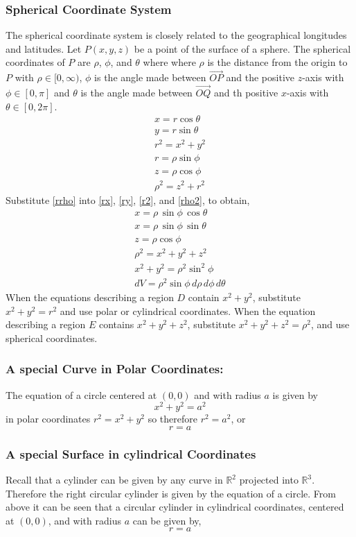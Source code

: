 \documentclass[14pt]{article}
\begin{document}
    \subsubsection{Spherical Coordinate System} 
    The spherical coordinate system is closely related to the geographical longitudes and latitudes. Let $P(x,y,z)$ be a point of the surface of a sphere. The spherical coordinates of $P$ are $\rho$, $\phi$, and $\theta$ where where $\rho$ is the distance from the origin to $P$ with $\rho\in[0,\infty)$, $\phi$ is the angle made between $\vec {OP}$ and the positive $z$-axis with $\phi\in[0, \pi]$ and $\theta$ is the angle made between $\vec{OQ}$ and th positive $x$-axis with $\theta\in[0,2\pi]$.
    \begin{align}
        x=r\cos\theta\label{rx}\\
        y=r\sin\theta\label{ry}\\
        r^2=x^2+y^2\label{r2}\\
        r=\rho\sin\phi\label{rrho}\\
        z=\rho\cos\phi\label{zrho}\\
        \rho^2=z^2+r^2\label{rho2}
    \end{align}
    Substitute \eqref{rrho} into \eqref{rx}, \eqref{ry}, \eqref{r2}, and \eqref{rho2}, to obtain,
    \begin{align*}
        x=\rho\,\sin\phi\,\cos\theta\\
        x=\rho\,\sin\phi\,\sin\theta\\
        z=\rho\cos\phi\\
        \rho^2=x^2+y^2+z^2\\
        x^2+y^2=\rho^2\sin^2\phi\\
        dV=\rho^2\sin\phi\,d\rho\, d\phi\, d\theta
    \end{align*}
    When the equations describing a region $D$ contain $x^2+y^2$, substitute $x^2+y^2=r^2$ and use polar or cylindrical coordinates. When the equation describing a region $E$ contains $x^2+y^2+z^2$, substitute $x^2+y^2+z^2=\rho^2$, and use spherical coordinates.
    \subsubsection{A special Curve in Polar Coordinates:}
    The equation of a circle centered at $(0,0)$ and with radius $a$ is given by 
    $$x^2+y^2=a^2$$
    in polar coordinates $r^2=x^2+y^2$ so therefore $r^2=a^2$, or
    $$r=a$$
    \subsubsection{A special Surface in cylindrical Coordinates}
    Recall that a cylinder can be given by any curve in $\mathbb{R}^2$ projected into $\mathbb{R}^3$. Therefore the right circular cylinder is given by the equation of a circle. From above it can be seen that a circular cylinder in cylindrical coordinates, centered at $(0,0)$, and with radius $a$ can be given by,
    $$r=a$$
\end{document}
